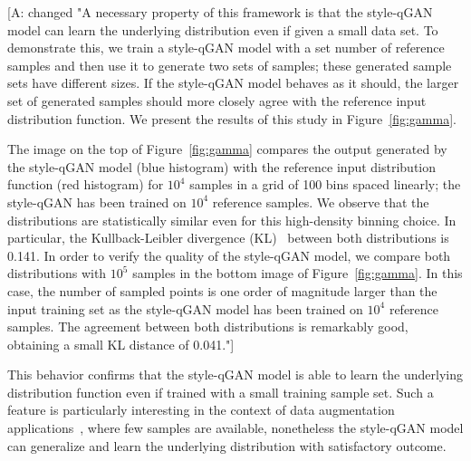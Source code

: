 \documentclass[twocolumn,preprintnumbers,superscriptaddress]{revtex4-2}
\newcommand{\commentAF}[1]{{\color{cyan} {[A: #1]}}}
\begin{document}
\commentAF{changed
"A necessary property of this framework is that the style-qGAN model can learn the underlying distribution even if given a small data set. To demonstrate this, we train a style-qGAN model with a set number of reference samples and then use it to generate two sets of samples; these generated sample sets have different sizes. If the style-qGAN model behaves as it should, the larger set of generated samples should more closely agree with the reference input distribution function. We present the results of this study in Figure~\ref{fig:gamma}.

The image on the top of Figure~\ref{fig:gamma} compares the output generated by
the style-qGAN model (blue histogram) with the reference input distribution
function (red histogram) for $10^4$ samples in a grid of 100 bins spaced
linearly; the style-qGAN has been trained on $10^4$ reference samples. We observe that the distributions are statistically similar even for
this high-density binning choice. In particular, the Kullback-Leibler
divergence (KL)~\cite{kullback1951information} between both distributions is
0.141.
%
In order to verify the quality of the style-qGAN model, we compare both distributions
with $10^5$ samples in the bottom image of Figure~\ref{fig:gamma}. In this case,
the number of sampled points is one order of magnitude larger than the input
training set as the style-qGAN model has been trained on $10^4$ reference samples. The agreement between both distributions is remarkably good,
obtaining a small KL distance of 0.041."}
%
This behavior confirms that the style-qGAN model is able to learn the underlying
distribution function even if trained with a small training sample set. Such a
feature is particularly interesting in the context of data augmentation
applications~\cite{frid2018synthetic,tanaka2019data}, where few samples are
available, nonetheless the style-qGAN model can generalize and learn the underlying distribution
with satisfactory outcome.
\end{document}
